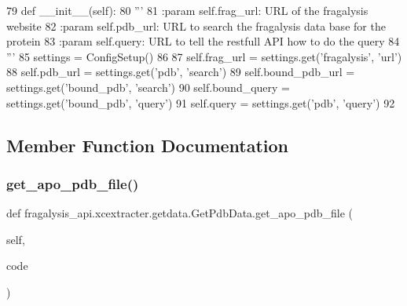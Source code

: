 \begin{DoxyCode}
79     \textcolor{keyword}{def }\_\_init\_\_(self):
80         \textcolor{stringliteral}{'''}
81 \textcolor{stringliteral}{        :param self.frag\_url: URL of the fragalysis website}
82 \textcolor{stringliteral}{        :param self.pdb\_url: URL to search the fragalysis data base for the protein}
83 \textcolor{stringliteral}{        :param self.query: URL to tell the restfull API how to do the query}
84 \textcolor{stringliteral}{        '''}
85         settings = ConfigSetup()
86 
87         self.frag\_url = settings.get(\textcolor{stringliteral}{'fragalysis'}, \textcolor{stringliteral}{'url'})
88         self.pdb\_url = settings.get(\textcolor{stringliteral}{'pdb'}, \textcolor{stringliteral}{'search'})
89         self.bound\_pdb\_url = settings.get(\textcolor{stringliteral}{'bound\_pdb'}, \textcolor{stringliteral}{'search'})
90         self.bound\_query = settings.get(\textcolor{stringliteral}{'bound\_pdb'}, \textcolor{stringliteral}{'query'})
91         self.query = settings.get(\textcolor{stringliteral}{'pdb'}, \textcolor{stringliteral}{'query'})
92 
\end{DoxyCode}


\subsection{Member Function Documentation}
\mbox{\label{classfragalysis__api_1_1xcextracter_1_1getdata_1_1_get_pdb_data_a1785640f7d8841b41773f04577065366}} 
\subsubsection{\texorpdfstring{get\+\_\+apo\+\_\+pdb\+\_\+file()}{get\_apo\_pdb\_file()}}
{\footnotesize\ttfamily def fragalysis\+\_\+api.\+xcextracter.\+getdata.\+Get\+Pdb\+Data.\+get\+\_\+apo\+\_\+pdb\+\_\+file (\begin{DoxyParamCaption}\item[{}]{self,  }\item[{}]{code }\end{DoxyParamCaption})}

